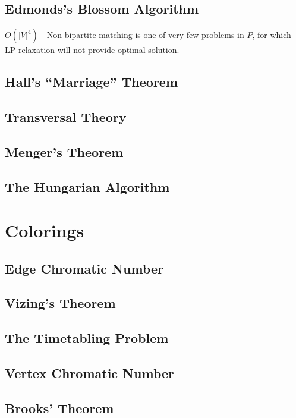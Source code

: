 		\section{Edmonds's Blossom Algorithm}
			$O(|V|^4)$
			- Non-bipartite matching is one of very few problems in $P$, for which LP relaxation will not provide optimal solution.

		\section{Hall's ``Marriage'' Theorem}

		\section{Transversal Theory}

		\section{Menger's Theorem}

		\section{The Hungarian Algorithm}

	\chapter{Colorings}
		\section{Edge Chromatic Number}

		\section{Vizing's Theorem}

		\section{The Timetabling Problem}

		\section{Vertex Chromatic Number}

		\section{Brooks' Theorem}

